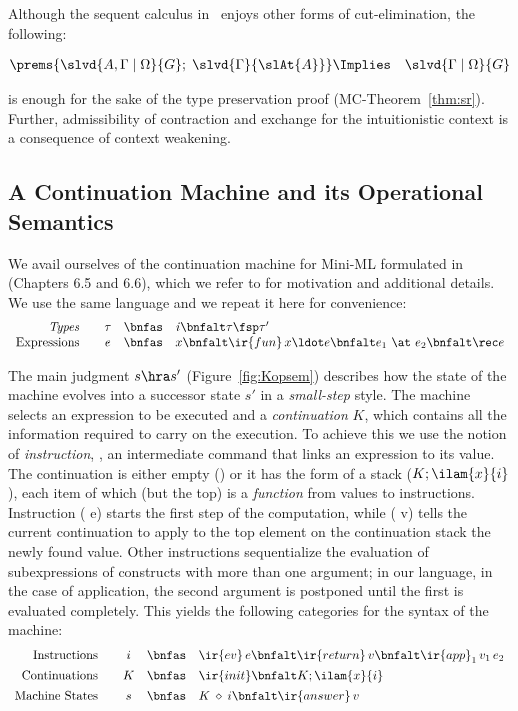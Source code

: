 \documentclass[final]{svjour3}
\begin{document}
Although the sequent calculus in~\cite{Polakow01phd} enjoys other
forms of cut-elimination, the following:
\begin{mccorollary}
  \begin{eqnarray*}
\prems{\slvd{A, \Gamma\coln\Omega}{G};\;
  \slvd{\Gamma}{\slAt{A}}} & \Implies & \slvd{\Gamma\coln\Omega}{G}  
\end{eqnarray*}
\end{mccorollary}
is enough for the sake of the type preservation proof
(MC-Theorem~\ref{thm:sr}). Further, admissibility of
contraction and exchange for the intuitionistic context is a
consequence of context weakening.



\subsection{A Continuation Machine and its Operational Semantics}
\label{sec:case}



 We avail ourselves of  the continuation machine for Mini-ML formulated
 in~\cite{Pfenning01book} (Chapters 6.5 and 6.6), which we refer to
 for motivation and additional details. We use the same language and
 we repeat it here for convenience: \[
\begin{array}{r@{\qquad}ccl}
 \mbox{\textit{Types}} & \tau & \bnfas & \mathit{i} \bnfalt \tau\fsp \tau' \\
  \mbox{Expressions} & e & \bnfas & x\bnfalt \ir{fun}\,x\ldot e \bnfalt
  e_1\ \at\ e_2
  \bnfalt \rec e
\end{array}
\]

                     


The main judgment $s\hra s'$ (Figure~\ref{fig:Kopsem}) describes how
the state of the machine evolves into a successor state $s'$
in a \emph{small-step} style. The machine selects an {expression} to be
executed and a \emph{continuation} $K$, which contains all the
information required to carry on the execution.  To achieve this we
use the notion of \emph{instruction}, \eg, an intermediate command that
links an expression to its value. The continuation is either empty
() or it has the form of a stack ($ K;\ilam{x}{i}$), each
item of which (but the top) is a \emph{function} from values to instructions.
Instruction (  e) starts the first step of the computation, while
( v) tells the current continuation to apply to the top element
on the continuation stack the newly found value.  Other instructions
sequentialize the evaluation of subexpressions of constructs with more
than one argument; in our language, in the case of application, the
second argument is postponed until the first is evaluated completely.
This yields the following categories for the syntax of the machine:
\[
\begin{array}{r@{\qquad}ccl}
\mbox{Instructions} & i & \bnfas & \ir{ev}\,e \bnfalt \ir{return}\,v \bnfalt
\ir{app}_1 \,v_1\,e_2 \\[1ex]
\mbox{Continuations} & K & \bnfas & \ir{init} \bnfalt K;\ilam{x}{i} \\[1ex]
\mbox{Machine States} & s & \bnfas & K\:\diamond\: i \bnfalt \ir{answer}\, v
\end{array}
\]
\end{document}
